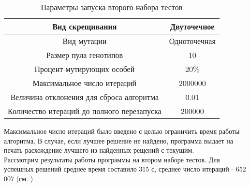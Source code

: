 \begin{table}[ht]
\centering
\begin{tabular}{|c|c|}
\hline
Вид скрещивания                            & Двуточечное  \\ \hline
Вид мутации                                & Одноточечная \\ \hline
Размер пула генотипов                      & 10           \\ \hline
Процент мутирующих особей                  & 20\%         \\ \hline
Максимальное число итераций                & 2000000      \\ \hline
Величина отклонения для сброса алгоритма   & 0.01         \\ \hline
Количество итераций до полного перезапуска & 200000       \\ \hline
\end{tabular}
\caption{Параметры запуска второго набора тестов}
\label{ParamTable}
\end{table}
\FloatBarrier
Максимальное число итераций было введено с целью ограничить время работы алгоритма. В случае, если лучшее решение не найдено, программа выдает на печать расхождение лучшего из найденных рещений с текущим.\\
Рассмотрим результаты работы программы на втором наборе тестов.
Для успешных решений среднее время составило 315 с, среднее число итераций - 652 007 (см. \cite{BigResults1})



